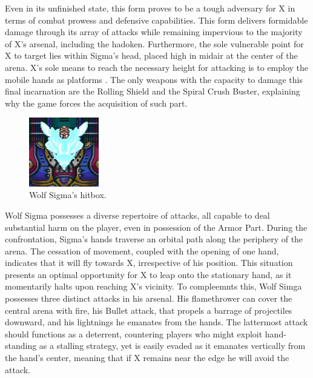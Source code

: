 Even in its unfinished state, this form proves to be a tough adversary for X in terms of combat prowess and defensive capabilities. This form delivers formidable damage through its array of attacks while remaining impervious to the majority of X's arsenal, including the hadoken. Furthermore, the sole vulnerable point for X to target lies within Sigma's head, placed high in midair at the center of the arena. X's sole means to reach the necessary height for attacking is to employ the mobile hands as platforms . The only weapons with the capacity to damage this final incarnation are the Rolling Shield and the Spiral Crush Buster, explaining why the game forces the acquisition of such part.

\begin{figure}[htp]
	\centering		
	\includegraphics[height=3cm]{figures/X1/Sigma_stages/WolfSigma_hitbox.jpg}
	\caption{Wolf Sigma's hitbox.}
\end{figure}
Wolf Sigma possesses a diverse repertoire of attacks, all capable to deal substantial harm on the player, even in possession of the Armor Part. During the confrontation, Sigma's hands traverse an orbital path along the periphery of the arena. The cessation of movement, coupled with the opening of one hand, indicates that it will fly towards X, irrespective of his position. This situation presents an optimal opportunity for X to leap onto the stationary hand, as it momentarily halts upon reaching X's vicinity. To compleemnts this, Wolf Simga possesses three distinct attacks in his arsenal. His flamethrower can cover the central arena with fire, his Bullet attack, that propels a barrage of projectiles downward, and his lightnings he emanates from the hands. The lattermost attack should functions as a deterrent, countering players who might exploit hand-standing as a stalling strategy, yet is easily evaded as it emanates vertically from the hand's center, meaning that if X remains near the edge he will avoid the attack. 

